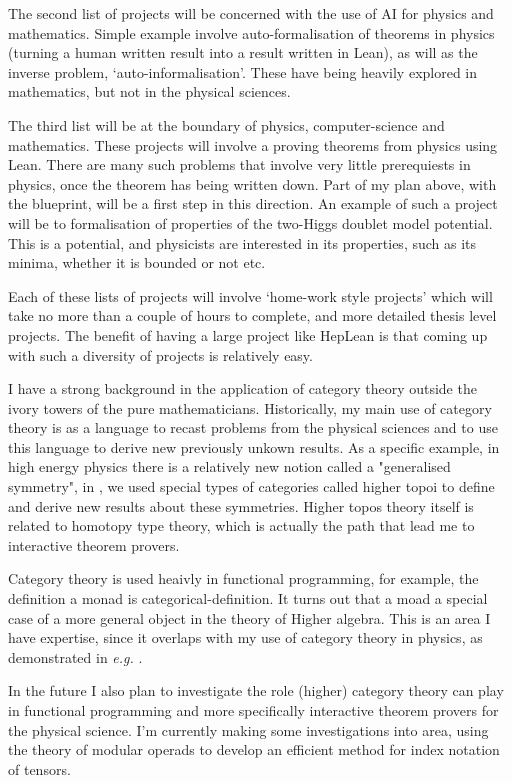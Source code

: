 \documentclass[12pt,letter]{article}
\newcounter{customtitle}
\begin{document}
The second list of projects  will be concerned with the use of AI for physics and mathematics. Simple example involve auto-formalisation of theorems in physics (turning a human written result into a result written in Lean), as will as the inverse problem, `auto-informalisation'. These have being heavily explored in mathematics, but not in the physical sciences. 

The third list will be at the boundary of physics, computer-science and mathematics. These projects will involve a proving theorems from physics using Lean. There are many such problems that involve very little prerequiests in physics, once the theorem has being written down. Part of my plan above, with the blueprint, will be a first step in this direction. An example of such a project will be to formalisation of properties of the two-Higgs doublet model potential. 
This is a potential, and physicists are interested in its properties, 
such as its minima, whether it is bounded or not etc.

Each of these lists of projects will involve `home-work style projects' which will take no more than a couple of hours to complete, and more detailed thesis level projects. The benefit of having a large project like HepLean is that coming up with such a diversity of projects is relatively easy. 

 I have a strong background in the application of category theory 
outside the ivory towers of the pure mathematicians. Historically, my main use of category theory 
is as a language to recast problems from the physical sciences and to use this language 
to derive new previously unkown results. As a specific example, in high energy physics 
there is a relatively new notion called a "generalised symmetry", in  , 
we used special types of categories called higher topoi to define and derive new results 
about these symmetries. Higher topos theory itself is related to homotopy type theory, which is actually 
the path that lead me to interactive theorem provers. 

Category theory is used heaivly in functional programming, for example, the definition a monad is categorical-definition. It turns out that a moad 
a special case of a more general object in the theory of Higher algebra. 
This is an area I have expertise, since it overlaps with my use of category theory in physics, as demonstrated in \emph{e.g.} \js{}. 

In the future I also plan to investigate the role (higher) category theory can play in functional programming and more specifically interactive theorem provers for the physical science. I'm currently making some investigations into area, using the theory of modular operads to develop an efficient method for index notation of tensors. 
\end{document}
